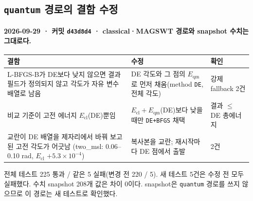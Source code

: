 \subsection{\texttt{quantum} 경로의 결함 수정}\label{quantum-fix}
\begingroup%
  \framesubtitle{2026-09-29 · 커밋 \texttt{d43d8d4} · classical·MAGSWT 경로와 snapshot 수치는 그대로다.}
  \small
  \begin{tabularx}{\textwidth}{@{}YYp{3.3cm}@{}}
    \toprule
    결함 & 수정 & 확인 \\
    \midrule
    L-BFGS-B가 DE보다 낮지 않으면 결과 필드가 정의되지 않고 각도가 자유 변수 배열로 남음
      & DE 각도와 그 점의 $E_{\mathrm{qm}}$로 먼저 채움(method \texttt{DE}, 전체 각도)
      & 강제 fallback 2건 \\
    비교 기준이 고전 에너지 $E_{\mathrm{cl}}$(DE)뿐임
      & $E_{\mathrm{cl}}+E_{\mathrm{qm}}$(DE)보다 낮을 때만 \texttt{DE+BFGS} 채택
      & 결과 $\le$ DE 총에너지 \\
    교란이 DE 배열을 제자리에서 바꿔 보고된 고전 각도가 어긋남
      (two\_msl: 0.06--0.10 rad, $E_{\mathrm{cl}}$ $+5.3\times10^{-4}$)
      & 복사본을 교란; 재시작마다 DE 점에서 출발
      & 2건 \\
    \bottomrule
  \end{tabularx}
  \par\medskip
  전체 테스트 225 통과 / 같은 5 실패(변경 전 220 / 5). 새 테스트 5건은 수정 전 모두 실패했다.
  수치 snapshot 208개 값은 차이 0이다. snapshot은 \texttt{quantum} 경로를 쓰지 않으므로 이 경로는 새 테스트로 확인했다.
  \par\medskip
\endgroup


